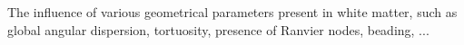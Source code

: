 The influence of various geometrical parameters present in white matter, such as global angular dispersion, tortuosity, presence of Ranvier nodes, beading, ...
